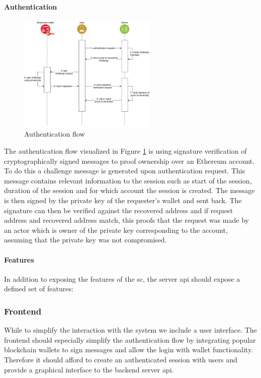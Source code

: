 \paragraph{Authentication}

\begin{figure}
    \centering
    \includegraphics[width=0.59\textwidth, keepaspectratio]{diagrams/authentication_flow.drawio.pdf}
    \caption{Authentication flow}
    \label{fig:auth_flow}
\end{figure}

The authentication flow visualized in Figure \ref{fig:auth_flow} is using signature verification of cryptographically signed messages to proof ownership over an Ethereum account. To do this a challenge message is generated upon authentication request. This message contains relevant information to the session such as start of the session, duration of the session and for which account the session is created. The message is then signed by the private key of the requester's wallet and sent back. The signature can then be verified against the recovered address and if request address and recovered address match, this proofs that the request was made by an actor which is owner of the private key corresponding to the account, assuming that the private key was not compromised.

\paragraph{Features}
In addition to exposing the features of the \gls{sc}, the server \gls{api} should expose a defined set of features:


\subsubsection{Frontend}
While to simplify the interaction with the system we include a user interface. The frontend should especially simplify the authentication flow by integrating popular blockchain wallets to sign messages and allow the login with wallet functionality. Therefore it should afford to create an authenticated session with users and provide a graphical interface to the backend server \gls{api}.

